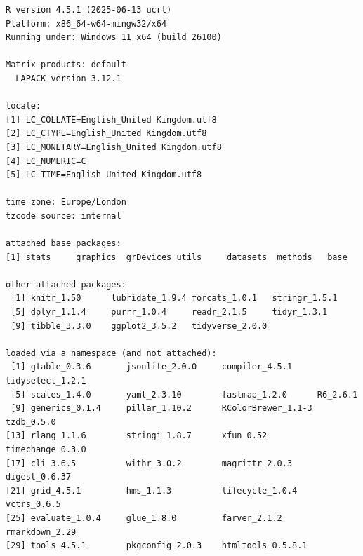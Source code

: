 \documentclass[
  letterpaper,
  DIV=11,
  numbers=noendperiod]{scrartcl}
\begin{document}
\begin{verbatim}
R version 4.5.1 (2025-06-13 ucrt)
Platform: x86_64-w64-mingw32/x64
Running under: Windows 11 x64 (build 26100)

Matrix products: default
  LAPACK version 3.12.1

locale:
[1] LC_COLLATE=English_United Kingdom.utf8 
[2] LC_CTYPE=English_United Kingdom.utf8   
[3] LC_MONETARY=English_United Kingdom.utf8
[4] LC_NUMERIC=C                           
[5] LC_TIME=English_United Kingdom.utf8    

time zone: Europe/London
tzcode source: internal

attached base packages:
[1] stats     graphics  grDevices utils     datasets  methods   base     

other attached packages:
 [1] knitr_1.50      lubridate_1.9.4 forcats_1.0.1   stringr_1.5.1  
 [5] dplyr_1.1.4     purrr_1.0.4     readr_2.1.5     tidyr_1.3.1    
 [9] tibble_3.3.0    ggplot2_3.5.2   tidyverse_2.0.0

loaded via a namespace (and not attached):
 [1] gtable_0.3.6       jsonlite_2.0.0     compiler_4.5.1     tidyselect_1.2.1  
 [5] scales_1.4.0       yaml_2.3.10        fastmap_1.2.0      R6_2.6.1          
 [9] generics_0.1.4     pillar_1.10.2      RColorBrewer_1.1-3 tzdb_0.5.0        
[13] rlang_1.1.6        stringi_1.8.7      xfun_0.52          timechange_0.3.0  
[17] cli_3.6.5          withr_3.0.2        magrittr_2.0.3     digest_0.6.37     
[21] grid_4.5.1         hms_1.1.3          lifecycle_1.0.4    vctrs_0.6.5       
[25] evaluate_1.0.4     glue_1.8.0         farver_2.1.2       rmarkdown_2.29    
[29] tools_4.5.1        pkgconfig_2.0.3    htmltools_0.5.8.1 
\end{verbatim}
\end{document}
